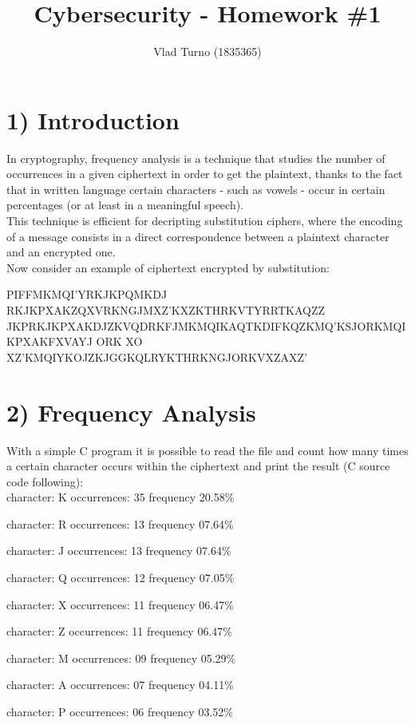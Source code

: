 \documentclass{article}
\title{Cybersecurity - Homework \#1}
\author{Vlad Turno (1835365)}
\begin{document}
\maketitle

\section*{1) Introduction}
In cryptography, frequency analysis is a technique that studies the number of occurrences in a given ciphertext in order to get the plaintext, thanks to the fact that in written language certain characters - such as vowels - occur in certain percentages (or at least in a meaningful speech).\\This technique is efficient for decripting substitution ciphers, where the encoding of a message consists in a direct correspondence between a plaintext character and an encrypted one.\\Now consider an example of ciphertext encrypted by substitution: 

\begin{tcolorbox} [title=I.ct]
PIFFMKMQI'YRKJKPQMKDJ RKJKPXAKZQXVRKNGJMXZ'KXZKTHRKVTYRRTKAQZZ
JKPRKJKPXAKDJZKVQDRKFJMKMQIKAQTKDIFKQZKMQ'KSJORKMQIKPXAKFXVAYJ
ORK XO XZ'KMQIYKOJZKJGGKQLRYKTHRKNGJORKVXZAXZ'
\end{tcolorbox}

\section*{2) Frequency Analysis}
With a simple C program it is possible to read the file and count how many times a certain character occurs within the ciphertext and print the result (C source code following):\\

character: K occurrences: 35 frequency 20.58\%

character: R occurrences: 13 frequency 07.64\%

character: J occurrences: 13 frequency 07.64\%

character: Q occurrences: 12 frequency 07.05\%

character: X occurrences: 11 frequency 06.47\%

character: Z occurrences: 11 frequency 06.47\%

character: M occurrences: 09 frequency 05.29\%

character: A occurrences: 07 frequency 04.11\%

character: P occurrences: 06 frequency 03.52\%
\end{document}
